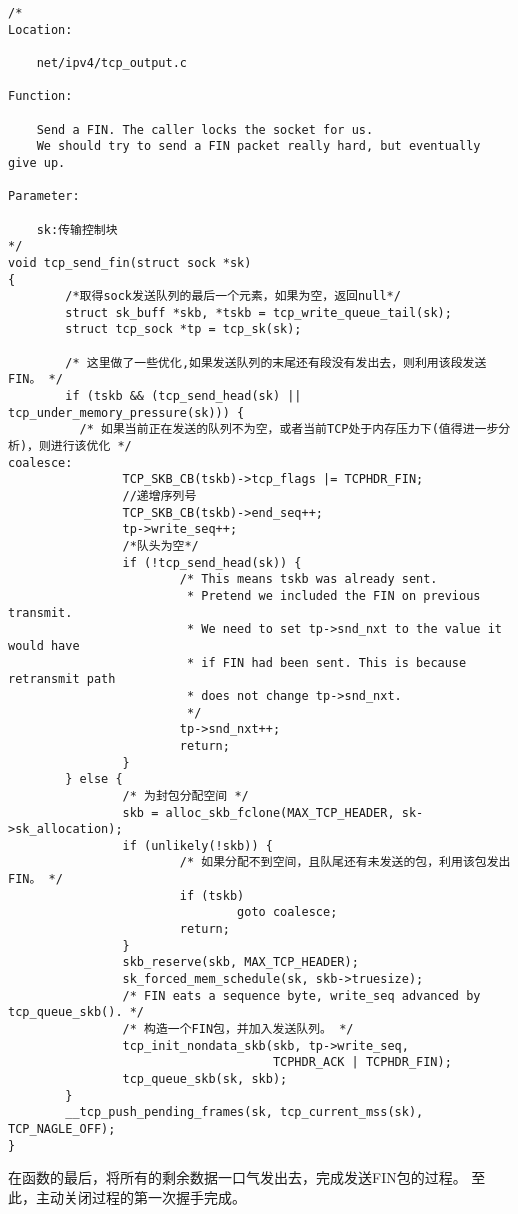 \begin{verbatim}
/* 
Location:

	net/ipv4/tcp_output.c

Function:

	Send a FIN. The caller locks the socket for us.
	We should try to send a FIN packet really hard, but eventually give up.

Parameter:

	sk:传输控制块
*/
void tcp_send_fin(struct sock *sk)
{
		/*取得sock发送队列的最后一个元素，如果为空，返回null*/
        struct sk_buff *skb, *tskb = tcp_write_queue_tail(sk);
        struct tcp_sock *tp = tcp_sk(sk);

        /* 这里做了一些优化,如果发送队列的末尾还有段没有发出去，则利用该段发送FIN。 */
        if (tskb && (tcp_send_head(sk) || tcp_under_memory_pressure(sk))) {
          /* 如果当前正在发送的队列不为空，或者当前TCP处于内存压力下(值得进一步分析)，则进行该优化 */
coalesce:
                TCP_SKB_CB(tskb)->tcp_flags |= TCPHDR_FIN;
				//递增序列号
                TCP_SKB_CB(tskb)->end_seq++;
                tp->write_seq++;
				/*队头为空*/
                if (!tcp_send_head(sk)) {
                        /* This means tskb was already sent.
                         * Pretend we included the FIN on previous transmit.
                         * We need to set tp->snd_nxt to the value it would have
                         * if FIN had been sent. This is because retransmit path
                         * does not change tp->snd_nxt.
                         */
                        tp->snd_nxt++;
                        return;
                }
        } else {
                /* 为封包分配空间 */
                skb = alloc_skb_fclone(MAX_TCP_HEADER, sk->sk_allocation);
                if (unlikely(!skb)) {
                        /* 如果分配不到空间，且队尾还有未发送的包，利用该包发出FIN。 */
                        if (tskb)
                                goto coalesce;
                        return;
                }
                skb_reserve(skb, MAX_TCP_HEADER);
                sk_forced_mem_schedule(sk, skb->truesize);
                /* FIN eats a sequence byte, write_seq advanced by tcp_queue_skb(). */
                /* 构造一个FIN包，并加入发送队列。 */
                tcp_init_nondata_skb(skb, tp->write_seq,
                                     TCPHDR_ACK | TCPHDR_FIN);
                tcp_queue_skb(sk, skb);
        }
        __tcp_push_pending_frames(sk, tcp_current_mss(sk), TCP_NAGLE_OFF);
}
\end{verbatim}
	在函数的最后，将所有的剩余数据一口气发出去，完成发送FIN包的过程。
	至此，主动关闭过程的第一次握手完成。

